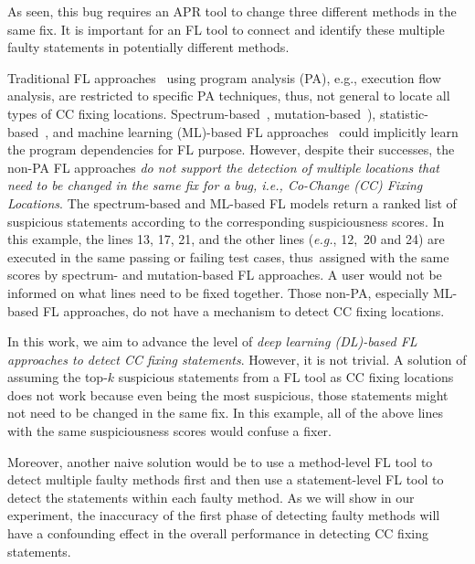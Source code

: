 
\vspace{3pt}
 As seen, this
bug requires an APR tool to change three different methods in the same fix.
It is important for an FL tool to connect and identify these multiple
faulty statements in potentially different methods.


Traditional FL approaches~\cite{zhang-fse09,ICICA-10} using program
analysis (PA), e.g., execution flow analysis, are restricted to
specific PA techniques, thus, not general to locate all types of CC
fixing locations.
Spectrum-based~\cite{jones2005empirical,abreu2006evaluation},
mutation-based~\cite{MUSE,papadakis2012using,Metallaxis}),
statistic-based~\cite{liblit-pldi05}, and machine learning (ML)-based
FL approaches~\cite{DeepFL,icse21-fl} could implicitly learn the
program dependencies for FL purpose. However, despite their successes,
the non-PA FL approaches {\em do not support the detection of multiple
  locations that need to be changed in the same fix for a bug, i.e.,
  Co-Change (CC) Fixing Locations}.
%
The spectrum-based and ML-based FL models return a ranked list of
suspicious statements according to the corresponding suspiciousness
scores. In this example, the lines 13, 17, 21, and the other lines
({\em e.g.}, 12,~20 and 24) are executed in the same passing or
failing test cases, thus~assigned with the same scores by
spectrum- and mutation-based FL approaches. A user would not be
informed on what lines need to be fixed together. Those non-PA,
especially ML-based FL approaches, do not have a mechanism to detect CC
fixing locations.

In this work, we aim to advance the level of {\em deep learning
  (DL)-based FL approaches to detect CC fixing statements}. However,
it is not trivial. A solution of assuming the top-$k$ suspicious
statements from a FL tool as CC fixing locations does not work because
even being the most suspicious, those statements might not need to be
changed in the same fix. In this example, all of the above lines with
the same suspiciousness scores would confuse a fixer.

Moreover, another naive solution would be to use a method-level FL
tool to detect multiple faulty methods first and then use a
statement-level FL tool to detect the statements within each faulty
method. As we will show in our experiment, the inaccuracy of the first
phase of detecting faulty methods will have a confounding effect in
the overall performance in detecting CC fixing statements.


